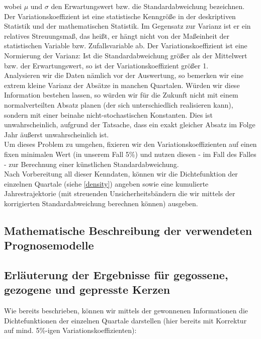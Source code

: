 \documentclass[a4paper,11pt]{article}
\begin{document}
wobei $\mu$ und $\sigma$ den Erwartungswert bzw. die Standardabweichung bezeichnen. Der Variationskoeffizient ist eine statistische Kenngröße in der deskriptiven Statistik und der mathematischen Statistik. Im Gegensatz zur Varianz ist er ein relatives Streuungsmaß, das heißt, er hängt nicht von der Maßeinheit der statistischen Variable bzw. Zufallsvariable ab. Der Variationskoeffizient ist eine Normierung der Varianz: Ist die Standardabweichung größer als der Mittelwert bzw. der Erwartungswert, so ist der Variationskoeffizient größer 1.\\

Analysieren wir die Daten nämlich vor der Auswertung, so bemerken wir eine extrem kleine Varianz der Absätze in manchen Quartalen. Würden wir diese Information bestehen lassen, so würden wir für die Zukunft nicht mit einem normalverteilten Absatz planen (der sich unterschiedlich realisieren kann), sondern mit einer beinahe nicht-stochastischen Konstanten. Dies ist unwahrscheinlich, aufgrund der Tatsache, dass ein exakt gleicher Absatz im Folge Jahr äußerst unwahrscheinlich ist.\\

Um dieses Problem zu umgehen, fixieren wir den Variationskoeffizienten auf einen fixen minimalen Wert (in unserem Fall 5\%) und nutzen diesen - im Fall des Falles - zur Berechnung einer künstlichen Standardabweichung.\\

Nach Vorbereitung all dieser Kenndaten, können wir die Dichtefunktion der einzelnen Quartale (siehe \ref{density}) angeben sowie eine kumulierte Jahrestrajektorie (mit streuenden Unsicherheitsbändern die wir mittels der korrigierten Standardabweichung berechnen können) ausgeben.

\subsection{Mathematische Beschreibung der verwendeten Prognosemodelle}
\subsection{Erläuterung der Ergebnisse für gegossene, gezogene und gepresste Kerzen}

Wie bereits beschrieben, können wir mittels der gewonnenen Informationen die Dichtefunktionen der einzelnen Quartale darstellen (hier bereits mit Korrektur auf mind. 5\%-igen Variationskoeffizienten):
\end{document}
